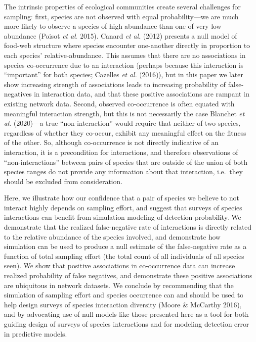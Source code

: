 \documentclass[11pt]{article}
\begin{document}
The intrinsic properties of ecological communities create several
challenges for sampling: first, species are not observed with equal
probability---we are much more likely to observe a species of high
abundance than one of very low abundance (Poisot \emph{et al.} 2015).
Canard \emph{et al.} (2012) presents a null model of food-web structure
where species encounter one-another directly in proportion to each
species' relative-abundance. This assumes that there are no associations
in species co-occurrence due to an interaction (perhaps because this
interaction is ``important'' for both species; Cazelles \emph{et al.}
(2016)), but in this paper we later show increasing strength of
associations leads to increasing probability of false-negatives in
interaction data, and that these positive associations are rampant in
existing network data. Second, observed co-occurrence is often equated
with meaningful interaction strength, but this is not necessarily the
case Blanchet \emph{et al.} (2020)---a true ``non-interaction'' would
require that neither of two species, regardless of whether they
co-occur, exhibit any meaningful effect on the fitness of the other. So,
although co-occurrence is not directly indicative of an interaction, it
is a precondition for interactions, and therefore observations of
``non-interactions'' between pairs of species that are outside of the
union of both species ranges do not provide any information about that
interaction, i.e.~they should be excluded from consideration.

Here, we illustrate how our confidence that a pair of species we believe
to not interact highly depends on sampling effort, and suggest that
surveys of species interactions can benefit from simulation modeling of
detection probability. We demonstrate that the realized false-negative
rate of interactions is directly related to the relative abundance of
the species involved, and demonstrate how simulation can be used to
produce a null estimate of the false-negative rate as a function of
total sampling effort (the total count of all individuals of all species
seen). We show that positive associations in co-occurrence data can
increase realized probability of false negatives, and demonstrate these
positive associations are ubiquitous in network datasets. We conclude by
recommending that the simulation of sampling effort and species
occurrence can and should be used to help design surveys of species
interaction diversity (Moore \& McCarthy 2016), and by advocating use of
null models like those presented here as a tool for both guiding design
of surveys of species interactions and for modeling detection error in
predictive models.
\end{document}
